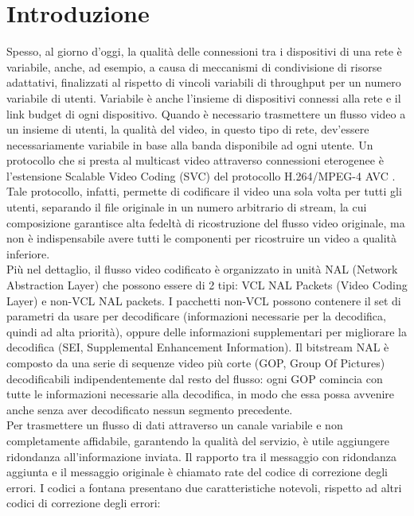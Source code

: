 \documentclass[italian, a4paper, 12pt]{article}
\begin{document}
\section{Introduzione} %
Spesso, al giorno d'oggi, la qualità delle connessioni tra i dispositivi di una rete è variabile, anche, ad esempio, a causa di meccanismi di condivisione di risorse adattativi, finalizzati al rispetto di vincoli variabili di throughput per un numero variabile di utenti. Variabile è anche l'insieme di dispositivi connessi alla rete e il link budget di ogni dispositivo. Quando è necessario trasmettere un flusso video a un insieme di utenti, la qualità del video, in questo tipo di rete, dev'essere necessariamente variabile in base alla banda disponibile ad ogni utente. Un protocollo che si presta al multicast video attraverso connessioni eterogenee è l'estensione Scalable Video Coding (SVC) del protocollo H.264/MPEG-4 AVC \cite{svc, h264}. Tale protocollo, infatti, permette di codificare il video una sola volta per tutti gli utenti, separando il file originale in un numero arbitrario di stream, la cui composizione garantisce alta fedeltà di ricostruzione del flusso video originale, ma non è indispensabile avere tutti le componenti per ricostruire un video a qualità inferiore.\\
Più nel dettaglio, il flusso video codificato è organizzato in unità NAL (Network Abstraction Layer) che possono essere di 2 tipi: VCL NAL Packets (Video Coding Layer) e non-VCL NAL packets. I pacchetti non-VCL possono contenere il set di parametri da usare per decodificare (informazioni necessarie per la decodifica, quindi ad alta priorità), oppure delle informazioni supplementari per migliorare la decodifica (SEI, Supplemental Enhancement Information). Il bitstream NAL è composto da una serie di sequenze video più corte (GOP, Group Of Pictures) decodificabili indipendentemente dal resto del flusso: ogni GOP comincia con tutte le informazioni necessarie alla decodifica, in modo che essa possa avvenire anche senza aver decodificato nessun segmento precedente.\\
Per trasmettere un flusso di dati attraverso un canale variabile e non completamente affidabile, garantendo la qualità del servizio, è utile aggiungere ridondanza all'informazione inviata. Il rapporto tra il messaggio con ridondanza aggiunta e il messaggio originale è chiamato rate del codice di correzione degli errori.
I codici a fontana \cite{fcsurvey, rossifc} presentano due caratteristiche notevoli, rispetto ad altri codici di correzione degli errori:
\end{document}
